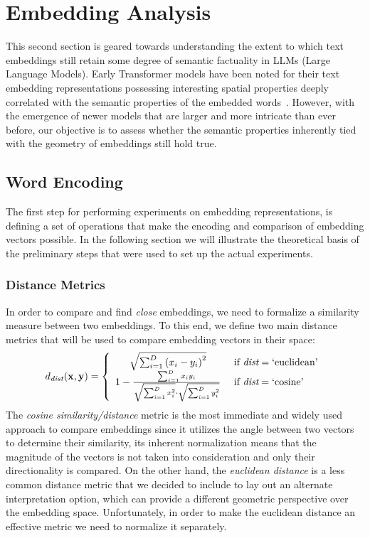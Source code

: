 \section{Embedding Analysis}\label{sec:method_embeddings}

This second section is geared towards understanding the extent to which text embeddings still retain some degree of semantic factuality in LLMs (Large Language Models).
Early Transformer models have been noted for their text embedding representations possessing interesting spatial properties deeply correlated with the semantic properties of the embedded words~\cite{allen2019,kalinowski2020}.
However, with the emergence of newer models that are larger and more intricate than ever before, our objective is to assess whether the semantic properties inherently tied with the geometry of embeddings still hold true.

\subsection{Word Encoding}

The first step for performing experiments on embedding representations, is defining a set of operations that make the encoding and comparison of embedding vectors possible.
In the following section we will illustrate the theoretical basis of the preliminary steps that were used to set up the actual experiments.

\subsubsection{Distance Metrics}

In order to compare and find \emph{close} embeddings, we need to formalize a similarity measure between two embeddings. 
To this end, we define two main distance metrics that will be used to compare embedding vectors in their space:
\begin{equation}
    d_{\textit{dist}}(\gbm{x}, \gbm{y}) = 
    \label{eq:method_embeddings_distance}
    \left\{
    \begin{array}{cl}
        \sqrt{\sum_{i=1}^{D}{{(x_i - y_i)}^2}} &\ \text{if}\ \textit{dist} = \text{`euclidean'} \\
        1 - \frac{\sum_{i=1}^{D}{x_i y_i}}{\sqrt{\sum_{i=1}^{D}{x_i^2}} \cdot \sqrt{\sum_{i=1}^{D}{y_i^2}}} &\ \text{if}\ \textit{dist} = \text{`cosine'}
    \end{array}
    \right.
\end{equation}
The \emph{cosine similarity/distance} metric is the most immediate and widely used approach to compare embeddings since it utilizes the angle between two vectors to determine their similarity, its inherent normalization means that the magnitude of the vectors is not taken into consideration and only their directionality is compared.
On the other hand, the \emph{euclidean distance} is a less common distance metric that we decided to include to lay out an alternate interpretation option, which can provide a different geometric perspective over the embedding space.
Unfortunately, in order to make the euclidean distance an effective metric we need to normalize it separately.

